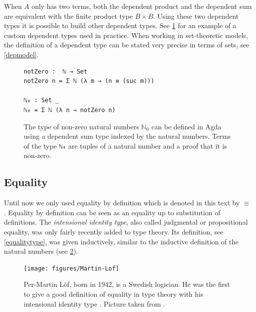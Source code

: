 \documentclass[12pt,a4paper,twoside,xetex,draft]{book}
\newcommand{\keyword}[1]{\emph{#1}\index{#1}}
\begin{document}



When $A$ only has two terms, both the dependent product and the dependent sum are equivalent with the finite product type $B \times B$. Using these two dependent types it is possible to build other dependent types. See \cref{non-zeroNats} for an example of a custom dependent types used in practice. When working in set-theoretic models, the definition of a dependent type can be stated very precise in terms of sets, see \cref{depmodel}.

\begin{figure}\label{non-zeroNats}
\centering
\begin{BVerbatim}
notZero :  ℕ → Set
notZero n = Σ ℕ (λ m → (n ≡ (suc m)))

ℕ₀ : Set _
ℕ₀ = Σ ℕ (λ n → notZero n)
\end{BVerbatim}
\caption{The type of non-zero natural numbers $\mathbb{N}_0$ can be defined in Agda using a dependent sum type indexed by the natural numbers. Terms of the type \texttt{ℕ₀} are tuples of a natural number and a proof that it is non-zero.}
\end{figure}


\subsection{Equality}

Until now we only used equality by definition which is denoted in this text by $\equiv$. Equality by definition can be seen as an equality up to substitution of definitions. The \keyword{intensional identity type}, also called judgmental or propositional equality, was only fairly recently added to type theory. Its definition, see \cref{equalitytype},  was given inductively, similar to the inductive definition of the natural numbers (see  \cref{fig:Per-Martin-L=0000F6f-presenting}).

\begin{figure}
  \centering{}
  \texttt{[image: figures/Martin-Lof]}
  \caption{\label{fig:Per-Martin-L=0000F6f-presenting}
    Per-Martin Löf, born in 1942, is a Swedish logician. He was the first to give a good definition of equality in type theory with his intensional identity type \cite{Martin-Loef1975}. Picture taken from  \cite{Academia2013}.}
\end{figure}
\end{document}
